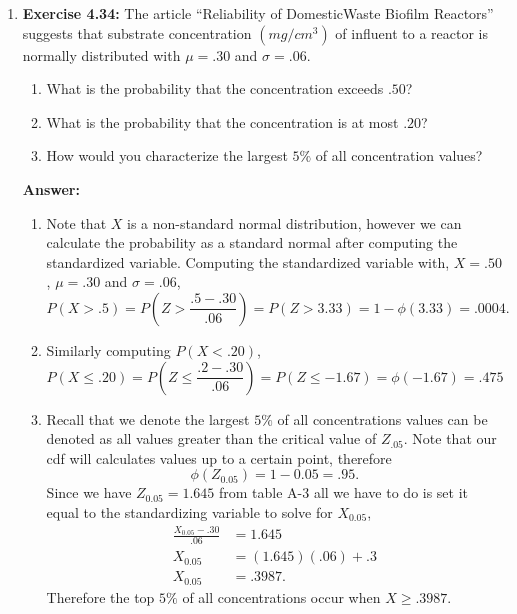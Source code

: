 \documentclass[12pt]{article}
\theoremstyle{homework}
\begin{document}
\begin{enumerate}
\vspace{.5in}





\item\hspace{.5in}\textbf{Exercise 4.34:} The article “Reliability of Domestic­Waste Biofilm Reactors” suggests that substrate concentration $(mg/cm^3)$ of influent to a reactor is normally distributed with $\mu = .30$ and $\sigma = .06$.
\begin{enumerate}
\item What is the probability that the concentration exceeds $.50$?
\item What is the probability that the concentration is at most $.20$?
\item How would you characterize the largest $5\%$ of all concentration values?
\end{enumerate}
\textbf{Answer:} 
\begin{enumerate}
\item Note that $X$ is a non-standard normal distribution, however we can calculate the probability as a standard normal
after computing the standardized variable. Computing the standardized variable with, $X = .50$, $\mu = .30$ and $\sigma = .06$,
\begin{equation*}
  P(X>.5) = P(Z>\frac{.5 - .30}{.06}) = P(Z > 3.33) = 1-\phi(3.33) = .0004.
\end{equation*}
\item Similarly computing $P(X<.20)$,
\begin{equation*}
  P(X\le.20) = P(Z \le \frac{.2 - .30}{.06}) = P(Z \le -1.67) = \phi(-1.67) = .475 
\end{equation*}
\item Recall that we denote the largest $5\%$ of all concentrations values can be denoted as all values greater than the critical value of $Z_{.05}$. 
Note that our cdf will calculates values up to a certain point, therefore
\begin{equation*}
  \phi(Z_{0.05}) = 1 - 0.05 = .95.
\end{equation*}
Since we have $Z_{0.05} = 1.645$ from table A-3 all we have to do is set it equal to the standardizing variable to solve for $X_{0.05}$,
\begin{align*}
  \frac{X_{0.05} - .30}{.06} &= 1.645\\
  X_{0.05} &= (1.645)(.06)+.3\\
  X_{0.05} &= .3987.
\end{align*}
Therefore the top $5\%$ of all concentrations occur when $X\geq .3987$.
\end{enumerate}
\vspace{.5in}








\end{enumerate}
\end{document}
